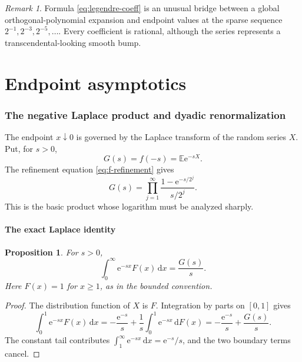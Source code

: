 \documentclass[11pt]{article}
\numberwithin{equation}{section}
\newtheorem{proposition}[theorem]{Proposition}
\theoremstyle{definition}
\theoremstyle{remark}
\newtheorem{remark}[theorem]{Remark}
\newcommand{\dd}{\,\mathrm{d}}
\newcommand{\e}{\mathrm{e}}
\begin{document}
\begin{remark}
Formula \eqref{eq:legendre-coeff} is an unusual bridge between a global
orthogonal-polynomial expansion and endpoint values at the sparse sequence
$2^{-1},2^{-3},2^{-5},\ldots$.  Every coefficient is rational, although the
series represents a transcendental-looking smooth bump.
\end{remark}

\part*{Endpoint asymptotics}

\section{The negative Laplace product and dyadic renormalization}
\label{sec:asymptotics}

The endpoint $x\downarrow0$ is governed by the Laplace transform of the
random series $X$.  Put, for $s>0$,
\begin{equation}\label{eq:G-def}
 G(s)=f(-s)=\mathbb E\e^{-sX}.
\end{equation}
The refinement equation \eqref{eq:f-refinement} gives
\begin{equation}\label{eq:G-product}
 G(s)=\prod_{j=1}^{\infty}
 \frac{1-\e^{-s/2^j}}{s/2^j}.
\end{equation}
This is the basic product whose logarithm must be analyzed sharply.

\subsection{The exact Laplace identity}

\begin{proposition}\label{prop:laplace-F}
For $s>0$,
\begin{equation}\label{eq:laplace-F}
 \int_0^{\infty}\e^{-sx}F(x)\dd x=\frac{G(s)}{s}.
\end{equation}
Here $F(x)=1$ for $x\ge1$, as in the bounded convention.
\end{proposition}

\begin{proof}
The distribution function of $X$ is $F$.  Integration by parts on $[0,1]$
gives
\[
 \int_0^1\e^{-sx}F(x)\dd x
 =-\frac{\e^{-s}}s+\frac1s\int_0^1\e^{-sx}\dd F(x)
 =-\frac{\e^{-s}}s+\frac{G(s)}s.
\]
The constant tail contributes
$\int_1^\infty\e^{-sx}\dd x=\e^{-s}/s$, and the two boundary terms cancel.
\end{proof}
\end{document}
